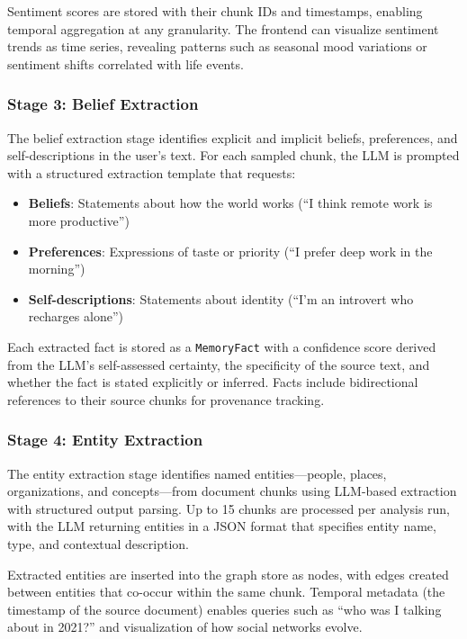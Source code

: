 \documentclass[manuscript,review]{acmart}
\begin{document}
Sentiment scores are stored with their chunk IDs and timestamps, enabling temporal aggregation at any granularity.
The frontend can visualize sentiment trends as time series, revealing patterns such as seasonal mood variations or sentiment shifts correlated with life events.

\subsubsection{Stage 3: Belief Extraction}
The belief extraction stage identifies explicit and implicit beliefs, preferences, and self-descriptions in the user's text.
For each sampled chunk, the LLM is prompted with a structured extraction template that requests:

\begin{itemize}
    \item \textbf{Beliefs}: Statements about how the world works (``I think remote work is more productive'')
    \item \textbf{Preferences}: Expressions of taste or priority (``I prefer deep work in the morning'')
    \item \textbf{Self-descriptions}: Statements about identity (``I'm an introvert who recharges alone'')
\end{itemize}

Each extracted fact is stored as a \texttt{MemoryFact} with a confidence score derived from the LLM's self-assessed certainty, the specificity of the source text, and whether the fact is stated explicitly or inferred.
Facts include bidirectional references to their source chunks for provenance tracking.

\subsubsection{Stage 4: Entity Extraction}
The entity extraction stage identifies named entities---people, places, organizations, and concepts---from document chunks using LLM-based extraction with structured output parsing.
Up to 15 chunks are processed per analysis run, with the LLM returning entities in a JSON format that specifies entity name, type, and contextual description.

Extracted entities are inserted into the graph store as nodes, with edges created between entities that co-occur within the same chunk.
Temporal metadata (the timestamp of the source document) enables queries such as ``who was I talking about in 2021?'' and visualization of how social networks evolve.
\end{document}
